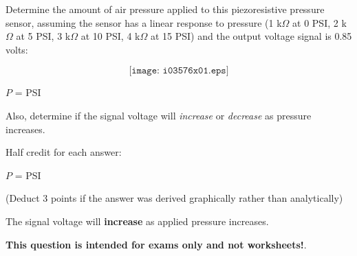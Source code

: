 

Determine the amount of air pressure applied to this piezoresistive pressure sensor, assuming the sensor has a linear response to pressure (1 k$\Omega$ at 0 PSI, 2 k$\Omega$ at 5 PSI, 3 k$\Omega$ at 10 PSI, 4 k$\Omega$ at 15 PSI) and the output voltage signal is 0.85 volts:

$$\texttt{[image: i03576x01.eps]}$$

$P$ = \underbar{\hskip 50pt} PSI

\vskip 10pt

Also, determine if the signal voltage will {\it increase} or {\it decrease} as pressure increases.







\noindent
Half credit for each answer:

\vskip 10pt

$P$ =  PSI

\vskip 10pt

(Deduct 3 points if the answer was derived graphically rather than analytically)

\vskip 10pt

The signal voltage will {\bf increase} as applied pressure increases.







{\bf This question is intended for exams only and not worksheets!}.




